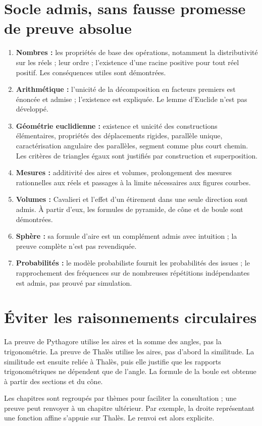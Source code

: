 \documentclass[11pt,a4paper,oneside]{book}
\begin{document}
\section{Socle admis, sans fausse promesse de preuve absolue}
\begin{enumerate}
\item \textbf{Nombres :} les propriétés de base des opérations, notamment la distributivité sur les réels ; leur ordre ; l'existence d'une racine positive pour tout réel positif. Les conséquences utiles sont démontrées.
\item \textbf{Arithmétique :} l'unicité de la décomposition en facteurs premiers est énoncée et admise ; l'existence est expliquée. Le lemme d'Euclide n'est pas développé.
\item \textbf{Géométrie euclidienne :} existence et unicité des constructions élémentaires, propriétés des déplacements rigides, parallèle unique, caractérisation angulaire des parallèles, segment comme plus court chemin. Les critères de triangles égaux sont justifiés par construction et superposition.
\item \textbf{Mesures :} additivité des aires et volumes, prolongement des mesures rationnelles aux réels et passages à la limite nécessaires aux figures courbes.
\item \textbf{Volumes :} Cavalieri et l'effet d'un étirement dans une seule direction sont admis. À partir d'eux, les formules de pyramide, de cône et de boule sont démontrées.
\item \textbf{Sphère :} sa formule d'aire est un complément admis avec intuition ; la preuve complète n'est pas revendiquée.
\item \textbf{Probabilités :} le modèle probabiliste fournit les probabilités des issues ; le rapprochement des fréquences sur de nombreuses répétitions indépendantes est admis, pas prouvé par simulation.
\end{enumerate}
\section{Éviter les raisonnements circulaires}
La preuve de Pythagore utilise les aires et la somme des angles, pas la trigonométrie. La preuve de Thalès utilise les aires, pas d'abord la similitude. La similitude est ensuite reliée à Thalès, puis elle justifie que les rapports trigonométriques ne dépendent que de l'angle. La formule de la boule est obtenue à partir des sections et du cône.

Les chapitres sont regroupés par thèmes pour faciliter la consultation ; une preuve peut renvoyer à un chapitre ultérieur. Par exemple, la droite représentant une fonction affine s'appuie sur Thalès. Le renvoi est alors explicite.
\end{document}
